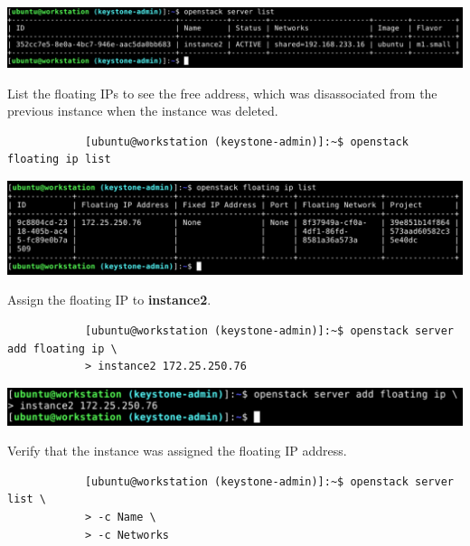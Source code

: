 \documentclass[letterpaper, 12pt]{article}
\begin{document}
\begin{enumerate}
\begin{labstep}
        \begin{center}
            \includegraphics[width=\linewidth]{images/part3/step4.png}
        \end{center}
    \end{labstep}

    \begin{labstep}
        List the floating IPs to see the free address, which was disassociated from the previous instance when the instance was deleted.
        \begin{lstlisting}
            [ubuntu@workstation (keystone-admin)]:~$ openstack floating ip list
        \end{lstlisting}

        \begin{center}
            \includegraphics[width=\linewidth]{images/part3/step5.png}
        \end{center}
    \end{labstep}

    \begin{labstep}
        Assign the floating IP to \textbf{instance2}.
        \begin{lstlisting}
            [ubuntu@workstation (keystone-admin)]:~$ openstack server add floating ip \
            > instance2 172.25.250.76
        \end{lstlisting}

        \begin{center}
            \includegraphics[width=\linewidth]{images/part3/step6.png}
        \end{center}
    \end{labstep}

    \begin{labstep}
        Verify that the instance was assigned the floating IP address.
        \begin{lstlisting}
            [ubuntu@workstation (keystone-admin)]:~$ openstack server list \
            > -c Name \
            > -c Networks
        \end{lstlisting}


\end{labstep}
\end{enumerate}
\end{document}
